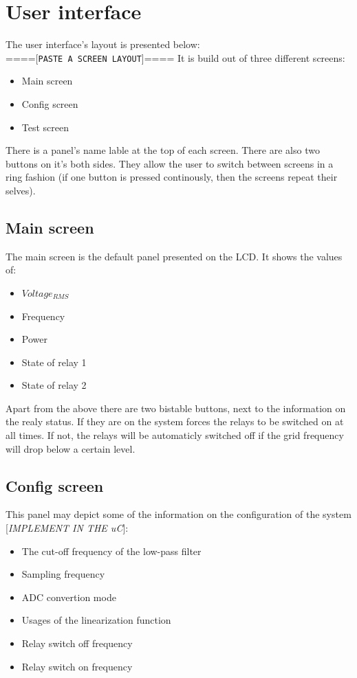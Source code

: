\section{User interface}
The user interface's layout is presented below:\\
====[\texttt{PASTE A SCREEN LAYOUT}]====
It is build out of three different screens:
\begin{itemize}
\item Main screen
\item Config screen
\item Test screen
\end{itemize}
There is a panel's name lable at the top of each screen. There are also two buttons on it's both sides. They allow the user to switch between screens in a ring fashion (if one button is pressed continously, then the screens repeat their selves).\\

\subsection{Main screen}
The main screen is the default panel presented on the LCD. It shows the values of:
\begin{itemize}
\item $ Voltage_{RMS} $
\item Frequency
\item Power
\item State of relay 1
\item State of relay 2
\end{itemize}
Apart from the above there are two bistable buttons, next to the information on the realy status. If they are on the system forces the relays to be switched on at all times. If not, the relays will be automaticly  switched off if the grid frequency will drop below a certain level.

\subsection{Config screen}
This panel may depict some of the information on the configuration of the system [\emph{IMPLEMENT IN THE uC}]:
\begin{itemize}
\item The cut-off frequency of the low-pass filter
\item Sampling frequency
\item ADC convertion mode
\item Usages of the linearization function
\item Relay switch off frequency
\item Relay switch on frequency
\end{itemize}

